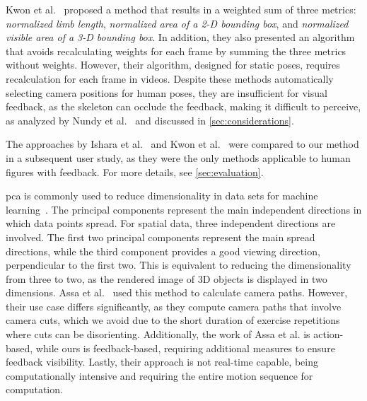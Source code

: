 Kwon et al.~\cite{kwon2020ocp} proposed a method that results in a weighted sum of three metrics: \emph{normalized limb length}, \emph{normalized area of a 2-D bounding box}, and \emph{normalized visible area of a 3-D bounding box}. In addition, they also presented an algorithm that avoids recalculating weights for each frame by summing the three metrics without weights. However, their algorithm, designed for static poses, requires recalculation for each frame in videos. Despite these methods automatically selecting camera positions for human poses, they are insufficient for visual feedback, as the skeleton can occlude the feedback, making it difficult to perceive, as analyzed by Nundy et al.~\cite{nundy2000wam} and discussed in \autoref{sec:considerations}.

The approaches by Ishara et al.~\cite{ishara2015mra} and Kwon et al.~\cite{kwon2020ocp} were compared to our method in a subsequent user study, as they were the only methods applicable to human figures with feedback. For more details, see \autoref{sec:evaluation}.

\acrshort{pca} is commonly used to reduce dimensionality in data sets for machine learning~\cite{sorzano2014sdr}. The principal components represent the main independent directions in which data points spread. For spatial data, three independent directions are involved. The first two principal components represent the main spread directions, while the third component provides a good viewing direction, perpendicular to the first two. This is equivalent to reducing the dimensionality from three to two, as the rendered image of 3D objects is displayed in two dimensions. Assa et al.~\cite{assa2008moh} used this method to calculate camera paths. However, their use case differs significantly, as they compute camera paths that involve camera cuts, which we avoid due to the short duration of exercise repetitions where cuts can be disorienting. Additionally, the work of Assa et al. is action-based, while ours is feedback-based, requiring additional measures to ensure feedback visibility. Lastly, their approach is not real-time capable, being computationally intensive and requiring the entire motion sequence for computation.

